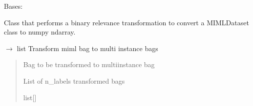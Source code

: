 \documentclass[letterpaper,10pt,english]{sphinxmanual}
\begin{document}
\begin{fulllineitems}
\label{\detokenize{transformation/mimlTOmi/_autosummary/miml.transformation.mimlTOmi.binary_relevance_transformation.BinaryRelevanceTransformation:miml.transformation.mimlTOmi.binary_relevance_transformation.BinaryRelevanceTransformation}}
\pysigstartsignatures
\pysigline
{}
\pysigstopsignatures
\sphinxAtStartPar
Bases: 

\sphinxAtStartPar
Class that performs a binary relevance transformation to convert a MIMLDataset class to numpy ndarray.

\begin{fulllineitems}
\label{\detokenize{transformation/mimlTOmi/_autosummary/miml.transformation.mimlTOmi.binary_relevance_transformation.BinaryRelevanceTransformation:miml.transformation.mimlTOmi.binary_relevance_transformation.BinaryRelevanceTransformation.transform_bag}}
\pysigstartsignatures
\pysiglinewithargsret
{}
{}
{{ $\rightarrow$ list}}
\pysigstopsignatures
\sphinxAtStartPar
Transform miml bag to multi instance bags
\begin{quote}\begin{description}
\sphinxAtStartPar
{} \textendash{} Bag to be transformed to multi\sphinxhyphen{}instance bag

\sphinxAtStartPar
{} \textendash{} List of n\_labels transformed bags

\sphinxAtStartPar
list{[}{\hyperref[\detokenize{data/_autosummary/miml.data.bag.Bag:miml.data.bag.Bag}]{}}{]}

\end{description}\end{quote}


\end{fulllineitems}
\end{fulllineitems}
\end{document}
